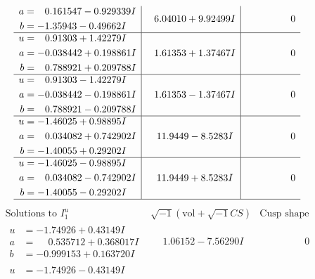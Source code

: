 \documentclass[1p]{elsarticle_modified}
\theoremstyle{definition}
\newcommand{\I}{\sqrt{-1}}
\begin{document}
$$\begin{array}{c|c|c}
\begin{aligned}
a &= \phantom{-}0.161547 - 0.929339 I \\
b &= -1.35943 - 0.49662 I\end{aligned}
 & \phantom{-}6.04010 + 9.92499 I & \phantom{-0.000000 } 0 \\ \hline\begin{aligned}
u &= \phantom{-}0.91303 + 1.42279 I \\
a &= -0.038442 + 0.198861 I \\
b &= \phantom{-}0.788921 + 0.209788 I\end{aligned}
 & \phantom{-}1.61353 + 1.37467 I & \phantom{-0.000000 } 0 \\ \hline\begin{aligned}
u &= \phantom{-}0.91303 - 1.42279 I \\
a &= -0.038442 - 0.198861 I \\
b &= \phantom{-}0.788921 - 0.209788 I\end{aligned}
 & \phantom{-}1.61353 - 1.37467 I & \phantom{-0.000000 } 0 \\ \hline\begin{aligned}
u &= -1.46025 + 0.98895 I \\
a &= \phantom{-}0.034082 + 0.742902 I \\
b &= -1.40055 + 0.29202 I\end{aligned}
 & \phantom{-}11.9449 - 8.5283 I & \phantom{-0.000000 } 0 \\ \hline\begin{aligned}
u &= -1.46025 - 0.98895 I \\
a &= \phantom{-}0.034082 - 0.742902 I \\
b &= -1.40055 - 0.29202 I\end{aligned}
 & \phantom{-}11.9449 + 8.5283 I & \phantom{-0.000000 } 0\\
 \hline 
 \end{array}$$\newpage$$\begin{array}{c|c|c}  
\text{Solutions to }I^u_{1}& \I (\text{vol} + \sqrt{-1}CS) & \text{Cusp shape}\\
 \hline 
\begin{aligned}
u &= -1.74926 + 0.43149 I \\
a &= \phantom{-}0.535712 + 0.368017 I \\
b &= -0.999153 + 0.163720 I\end{aligned}
 & \phantom{-}1.06152 - 7.56290 I & \phantom{-0.000000 } 0 \\ \hline\begin{aligned}
u &= -1.74926 - 0.43149 I \\

\end{aligned}
\end{array}$$
\end{document}
